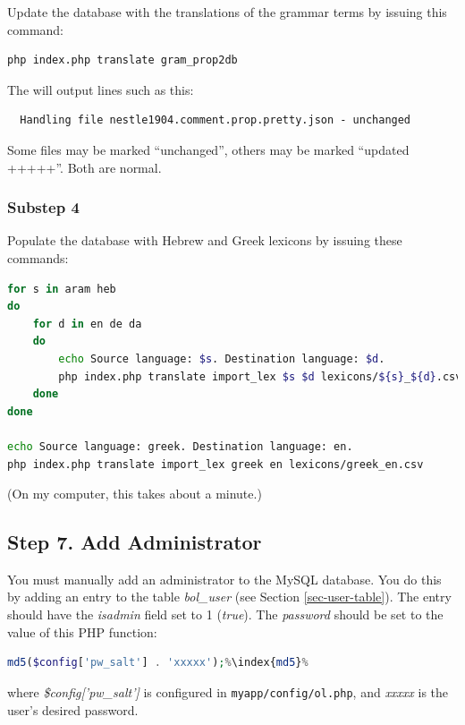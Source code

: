 \documentclass[11pt,oneside,a4paper]{memoir}
\newcommand{\q}{{\mainnolig '}}
\begin{document}
Update the database with the translations of the grammar terms by issuing this command:

\begin{lstlisting}[language=bash]
php index.php translate gram_prop2db
\end{lstlisting}

The will output lines such as this:

\begin{lstlisting}
  Handling file nestle1904.comment.prop.pretty.json - unchanged
\end{lstlisting}

Some files may be marked ``unchanged'', others may be marked ``updated +++++''. Both are normal.

\subsubsection*{Substep 4}

Populate the database with Hebrew and Greek lexicons by issuing these commands:
\begin{lstlisting}[language=bash]
for s in aram heb
do
    for d in en de da
    do
        echo Source language: $s. Destination language: $d.
        php index.php translate import_lex $s $d lexicons/${s}_${d}.csv
    done
done

echo Source language: greek. Destination language: en.
php index.php translate import_lex greek en lexicons/greek_en.csv 
\end{lstlisting}

(On my computer, this takes about a minute.)


\subsection{Step 7. Add Administrator}

You must manually add an administrator to the MySQL database. You do this by adding an entry to the
table \emph{bol\_user} (see Section \ref{sec-user-table}).
The entry should have the \emph{isadmin} field set to 1 (\emph{true}). The
\emph{password} should be set to the value of this PHP function:

\begin{lstlisting}[language=PHP]
md5($config['pw_salt'] . 'xxxxx');%\index{md5}%
\end{lstlisting}

\noindent
where \emph{\$config[\q pw\_salt\q]} is configured in \texttt{myapp/config/ol.php}, and
\emph{xxxxx} is the user's desired password.
\end{document}
